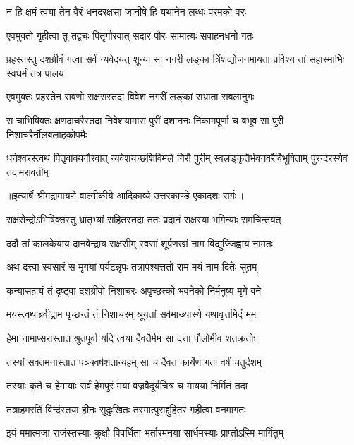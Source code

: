 \twolineshloka
{न हि क्षमं त्वया तेन वैरं धनदरक्षसा}
{जानीषे हि यथानेन लब्धः परमको वरः} %

\twolineshloka
{एवमुक्तो गृहीत्वा तु तद्वचः पितृगौरवात्}
{सदार पौरः सामात्यः सवाहनधनो गतः} %

\threelineshloka
{प्रहस्तस्तु दशग्रीवं गत्वा सर्वं न्यवेदयत्}
{शून्या सा नगरी लङ्का त्रिंशद्योजनमायता}
{प्रविश्य तां सहास्माभिः स्वधर्मं तत्र पालय} %

\twolineshloka
{एवमुक्तः प्रहस्तेन रावणो राक्षसस्तदा}
{विवेश नगरीं लङ्कां सभ्राता सबलानुगः} %

\fourlineindentedshloka
{स चाभिषिक्तः क्षणदाचरैस्तदा}
{निवेशयामास पुरीं दशाननः}
{निकामपूर्णा च बभूव सा पुरी}
{निशाचरैर्नीलबलाहकोपमैः} %

\fourlineindentedshloka
{धनेश्वरस्त्वथ पितृवाक्यगौरवात्}
{न्यवेशयच्छशिविमले गिरौ पुरीम्}
{स्वलङ्कृतैर्भवनवरैर्विभूषिताम्}
{पुरन्दरस्येव तदामरावतीम्} %


{॥इत्यार्षे श्रीमद्रामायणे वाल्मीकीये आदिकाव्ये उत्तरकाण्डे एकादशः सर्गः॥}


\twolineshloka
{राक्षसेन्द्रोऽभिषिक्तस्तु भ्रातृभ्यां सहितस्तदा}
{ततः प्रदानं राक्षस्या भगिन्याः समचिन्तयत्} %

\twolineshloka
{ददौ तां कालकेयाय दानवेन्द्राय राक्षसीम्}
{स्वसां शूर्पणखां नाम विद्युज्जिह्वाय नामतः} %

\twolineshloka
{अथ दत्त्वा स्वसारं स मृगयां पर्यटन्नृपः}
{तत्रापश्यत्ततो राम मयं नाम दितेः सुतम्} %

\twolineshloka
{कन्यासहायं तं दृष्ट्वा दशग्रीवो निशाचरः}
{अपृच्छत्को भवनेको निर्मनुष्य मृगे वने} %

\twolineshloka
{मयस्त्वथाब्रवीद्राम पृच्छन्तं तं निशाचरम्}
{श्रूयतां सर्वमाख्यास्ये यथावृत्तमिदं मम} %

\twolineshloka
{हेमा नामाप्सरास्तात श्रुतपूर्वा यदि त्वया}
{दैवतैर्मम सा दत्ता पौलोमीव शतक्रतोः} %

\twolineshloka
{तस्यां सक्तमनास्तात पञ्चवर्षशतान्यहम्}
{सा च दैवत कार्येण गता वर्षं चतुर्दशम्} %

\twolineshloka
{तस्याः कृते च हेमायाः सर्वं हेमपुरं मया}
{वज्रवैदूर्यचित्रं च मायया निर्मितं तदा} %

\twolineshloka
{तत्राहमरतिं विन्दंस्तया हीनः सुदुःखितः}
{तस्मात्पुराद्दुहितरं गृहीत्वा वनमागतः} %

\twolineshloka
{इयं ममात्मजा राजंस्तस्याः कुक्षौ विवर्धिता}
{भर्तारमनया सार्धमस्याः प्राप्तोऽस्मि मार्गितुम्} %

